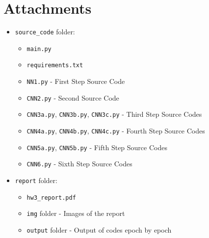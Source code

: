 \documentclass[a4paper, 11pt]{article}
\begin{document}
	\section*{Attachments}
	\begin{itemize}
		\item \texttt{source\_code} folder:
		\begin{itemize}
			\item \texttt{main.py}
			\item \texttt{requirements.txt}
			\item \texttt{NN1.py} - First Step Source Code
			\item \texttt{CNN2.py} - Second Source Code
			\item \texttt{CNN3a.py}, \texttt{CNN3b.py}, \texttt{CNN3c.py} - Third Step Source Codes
			\item \texttt{CNN4a.py}, \texttt{CNN4b.py}, \texttt{CNN4c.py} - Fourth Step Source Codes
			\item \texttt{CNN5a.py}, \texttt{CNN5b.py} - Fifth Step Source Codes
			\item \texttt{CNN6.py} - Sixth Step Source Codes
		\end{itemize}
		\item \texttt{report} folder:
		\begin{itemize}
			\item \texttt{hw3\_report.pdf}
			\item \texttt{img} folder - Images of the report
			\item \texttt{output} folder - Output of codes epoch by epoch
		\end{itemize}
	\end{itemize}

	
\end{document}
